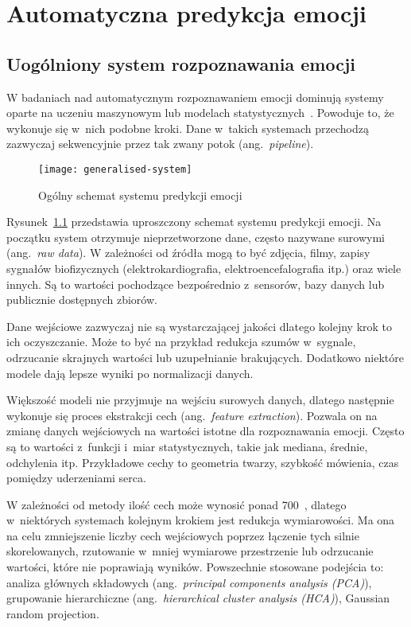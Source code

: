\chapter{Automatyczna predykcja emocji}
\label{ch:automatyczna-predykcja-emocji}

\section{Uogólniony system rozpoznawania emocji}
\label{sec:uogolniony-system-rozpoznawania-emocji}

W badaniach nad automatycznym rozpoznawaniem emocji dominują systemy oparte na uczeniu maszynowym lub modelach statystycznych~\cite{Varghese2015, Dzedzickis2020}.
Powoduje to, że wykonuje się w~nich podobne kroki.
Dane w~takich systemach przechodzą zazwyczaj sekwencyjnie przez tak zwany potok (ang.~\textit{pipeline}).

\begin{figure}[h]
    \centering
    \texttt{[image: generalised-system]}
    \caption{Ogólny schemat systemu predykcji emocji}
    \label{fig:generalised-system}
\end{figure}

Rysunek~\ref{fig:generalised-system} przedstawia uproszczony schemat systemu predykcji emocji.
Na początku system otrzymuje nieprzetworzone dane, często nazywane surowymi (ang.~\textit{raw data}).
W zależności od źródła mogą to być zdjęcia, filmy, zapisy sygnałów biofizycznych (elektrokardiografia, elektroencefalografia itp.) oraz wiele innych.
Są to wartości pochodzące bezpośrednio z~sensorów, bazy danych lub publicznie dostępnych zbiorów.

Dane wejściowe zazwyczaj nie są wystarczającej jakości dlatego kolejny krok to ich oczyszczanie.
Może to być na przykład redukcja szumów w~sygnale, odrzucanie skrajnych wartości lub uzupełnianie brakujących.
Dodatkowo niektóre modele dają lepsze wyniki po normalizacji danych.

Większość modeli nie przyjmuje na wejściu surowych danych, dlatego następnie wykonuje się proces ekstrakcji cech (ang.~\textit{feature extraction}).
Pozwala on na zmianę danych wejściowych na wartości istotne dla rozpoznawania emocji.
Często są to wartości z~funkcji i~miar statystycznych, takie jak mediana, średnie, odchylenia itp.
Przykładowe cechy to geometria twarzy, szybkość mówienia, czas pomiędzy uderzeniami serca.

W zależności od metody ilość cech może wynosić ponad 700~\cite{Wood2022}, dlatego w~niektórych systemach kolejnym krokiem jest redukcja wymiarowości.
Ma ona na celu zmniejszenie liczby cech wejściowych poprzez łączenie tych silnie skorelowanych, rzutowanie w~mniej wymiarowe przestrzenie lub odrzucanie wartości, które nie poprawiają wyników.
Powszechnie stosowane podejścia to: analiza głównych składowych (ang.~\textit{principal components analysis (PCA)}), grupowanie hierarchiczne (ang.~\textit{hierarchical cluster analysis (HCA)}), Gaussian random projection.

